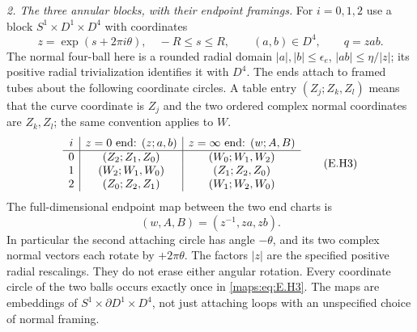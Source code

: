 \begin{theorem}
\emph{2. The three annular blocks, with their endpoint framings.}
For $i=0,1,2$ use a block $S^1\times D^1\times D^4$ with coordinates
\[
 z=\exp(s+2\pi i\theta),\quad -R\leq s\leq R,
 \qquad (a,b)\in D^4,\qquad q=zab.
 \tag{E.H2}\label{maps:eq:E.H2}
\]
The normal four-ball here is a rounded radial domain
$|a|,|b|\leq\epsilon_e$, $|ab|\leq\eta/|z|$;
its positive radial trivialization identifies it with $D^4$.
The ends attach to framed tubes about the following coordinate
circles.  A table entry $(Z_j;Z_k,Z_l)$ means that the curve
coordinate is $Z_j$ and the two ordered complex normal coordinates
are $Z_k,Z_l$; the same convention applies to $W$.
\[
\begin{array}{c|c|c}
 i&z=0\hbox{ end: }(z;a,b)&z=\infty\hbox{ end: }(w;A,B)\\ \hline
0&(Z_2;Z_1,Z_0)&(W_0;W_1,W_2)\\
1&(W_2;W_1,W_0)&(Z_1;Z_2,Z_0)\\
2&(Z_0;Z_2,Z_1)&(W_1;W_2,W_0)
\end{array}
\tag{E.H3}\label{maps:eq:E.H3}
\]
The full-dimensional endpoint map between the two end charts is
\[
                 (w,A,B)=(z^{-1},za,zb).
 \tag{E.H4}\label{maps:eq:E.H4}
\]
In particular the second attaching circle has angle $-\theta$,
and its two complex normal vectors each rotate by $+2\pi\theta$.
The factors $|z|$ are the specified positive radial rescalings.
They do not erase either angular rotation.  Every coordinate circle
of the two balls occurs exactly once in \eqref{maps:eq:E.H3}.  The maps are
embeddings of $S^1\times\partial D^1\times D^4$, not just attaching
loops with an unspecified choice of normal framing.


\end{theorem}
